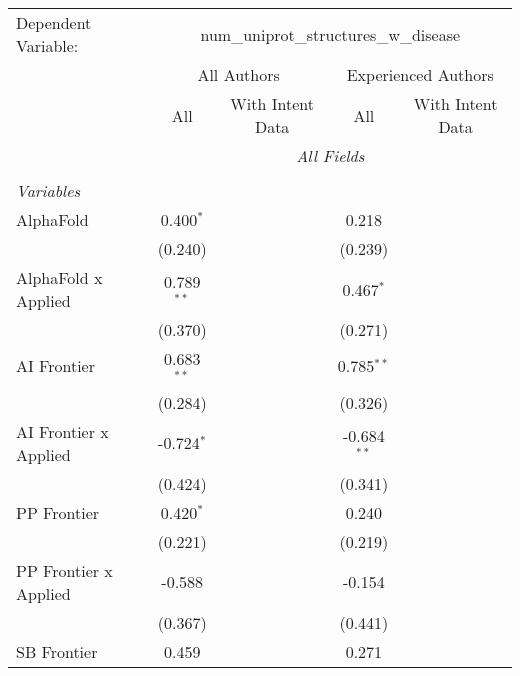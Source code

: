 \begingroup
\centering
\begin{tabular}{lcccccc}
   \tabularnewline \midrule \midrule
   Dependent Variable: & \multicolumn{6}{c}{num\_uniprot\_structures\_w\_disease}\\
 & \multicolumn{3}{c}{All Authors} & \multicolumn{3}{c}{Experienced Authors} \\
\cmidrule(lr){2-4} \cmidrule(lr){5-7}
 & \multicolumn{1}{c}{All} & \multicolumn{2}{c}{With Intent Data} & \multicolumn{1}{c}{All} & \multicolumn{2}{c}{With Intent Data} \\
\cmidrule(lr){2-2} \cmidrule(lr){3-4} \cmidrule(lr){5-5} \cmidrule(lr){6-7}
 & \multicolumn{6}{c}{\textit{All Fields}} \\ \\
   \emph{Variables}\\
   AlphaFold             & 0.400$^{*}$  &         &         & 0.218         &        &   \\   
                         & (0.240)      &         &         & (0.239)       &        &   \\   
   AlphaFold x Applied   & 0.789$^{**}$ &         &         & 0.467$^{*}$   &        &   \\   
                         & (0.370)      &         &         & (0.271)       &        &   \\   
   AI Frontier           & 0.683$^{**}$ &         &         & 0.785$^{**}$  &        &   \\   
                         & (0.284)      &         &         & (0.326)       &        &   \\   
   AI Frontier x Applied & -0.724$^{*}$ &         &         & -0.684$^{**}$ &        &   \\   
                         & (0.424)      &         &         & (0.341)       &        &   \\   
   PP Frontier           & 0.420$^{*}$  &         &         & 0.240         &        &   \\   
                         & (0.221)      &         &         & (0.219)       &        &   \\   
   PP Frontier x Applied & -0.588       &         &         & -0.154        &        &   \\   
                         & (0.367)      &         &         & (0.441)       &        &   \\   
   SB Frontier           & 0.459        &         &         & 0.271         &        &   \\   

\end{tabular}
